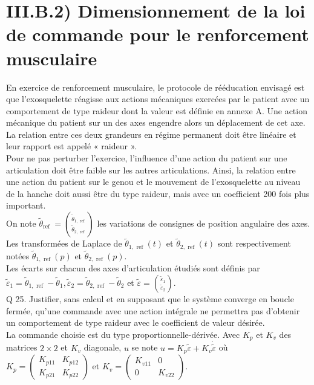 \documentclass[10pt]{article}
\begin{document}
\section*{III.B.2) Dimensionnement de la loi de commande pour le renforcement musculaire}
En exercice de renforcement musculaire, le protocole de rééducation envisagé est que l'exosquelette réagisse aux actions mécaniques exercées par le patient avec un comportement de type raideur dont la valeur est définie en annexe A. Une action mécanique du patient sur un des axes engendre alors un déplacement de cet axe. La relation entre ces deux grandeurs en régime permanent doit être linéaire et leur rapport est appelé « raideur ».\\
Pour ne pas perturber l'exercice, l'influence d'une action du patient sur une articulation doit être faible sur les autres articulations. Ainsi, la relation entre une action du patient sur le genou et le mouvement de l'exosquelette au niveau de la hanche doit aussi être du type raideur, mais avec un coefficient 200 fois plus important.\\
On note $\tilde{\theta}_{\text {ref }}=\binom{\tilde{\theta}_{1, \text { ref }}}{\tilde{\theta}_{2, \text { ref }}}$ les variations de consignes de position angulaire des axes. Les transformées de Laplace de $\tilde{\theta}_{1, \text { ref }}(t)$ et $\tilde{\theta}_{2, \text { ref }}(t)$ sont respectivement notées $\tilde{\theta}_{1, \text { ref }}(p)$ et $\tilde{\theta}_{2, \text { ref }}(p)$.\\
Les écarts sur chacun des axes d'articulation étudiés sont définis par $\tilde{\varepsilon}_{1}=\tilde{\theta}_{1, \text { ref }}-\tilde{\theta}_{1}, \tilde{\varepsilon}_{2}=\tilde{\theta}_{2, \text { ref }}-\tilde{\theta}_{2}$ et $\tilde{\varepsilon}=\binom{\tilde{\varepsilon}_{1}}{\tilde{\varepsilon}_{2}}$.\\
Q 25. Justifier, sans calcul et en supposant que le système converge en boucle fermée, qu'une commande avec une action intégrale ne permettra pas d'obtenir un comportement de type raideur avec le coefficient de valeur désirée.\\
La commande choisie est du type proportionnelle-dérivée. Avec $K_{p}$ et $K_{v}$ des matrices $2 \times 2$ et $K_{v}$ diagonale, $u$ se note $u=K_{p} \tilde{\varepsilon}+K_{v} \dot{\tilde{\varepsilon}}$ où $K_{p}=\left(\begin{array}{cc}K_{p 11} & K_{p 12} \\ K_{p 21} & K_{p 22}\end{array}\right)$ et $K_{v}=\left(\begin{array}{cc}K_{v 11} & 0 \\ 0 & K_{v 22}\end{array}\right)$.\\
\end{document}
